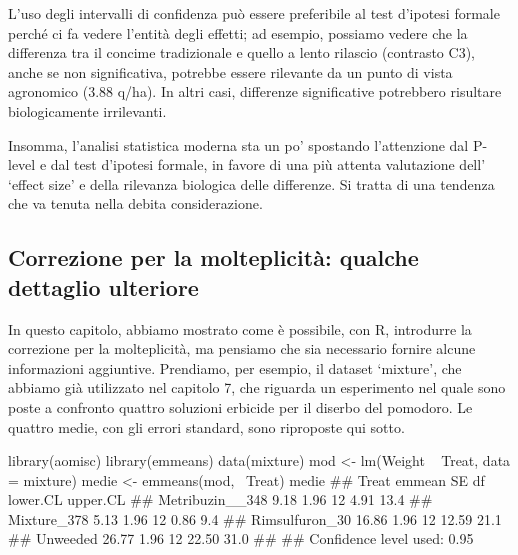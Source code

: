 \documentclass[a4paper,12pt,oneside]{book}
\newenvironment{Shaded}{}{}
\newcommand{\KeywordTok}[1]{#1}
\newcommand{\DataTypeTok}[1]{#1}
\newcommand{\StringTok}[1]{#1}
\newcommand{\CommentTok}[1]{#1}
\newcommand{\OperatorTok}[1]{#1}
\newcommand{\NormalTok}[1]{#1}
\begin{document}
L'uso degli intervalli di confidenza può essere preferibile al test d'ipotesi formale perché ci fa vedere l'entità degli effetti; ad esempio, possiamo vedere che la differenza tra il concime tradizionale e quello a lento rilascio (contrasto C3), anche se non significativa, potrebbe essere rilevante da un punto di vista agronomico (3.88 q/ha). In altri casi, differenze significative potrebbero risultare biologicamente irrilevanti.

Insomma, l'analisi statistica moderna sta un po' spostando l'attenzione dal P-level e dal test d'ipotesi formale, in favore di una più attenta valutazione dell' `effect size' e della rilevanza biologica delle differenze. Si tratta di una tendenza che va tenuta nella debita considerazione.

\hypertarget{correzione-per-la-molteplicita-qualche-dettaglio-ulteriore}{%
\subsection{Correzione per la molteplicità: qualche dettaglio ulteriore}\label{correzione-per-la-molteplicita-qualche-dettaglio-ulteriore}}

In questo capitolo, abbiamo mostrato come è possibile, con R, introdurre la correzione per la molteplicità, ma pensiamo che sia necessario fornire alcune informazioni aggiuntive. Prendiamo, per esempio, il dataset `mixture', che abbiamo già utilizzato nel capitolo 7, che riguarda un esperimento nel quale sono poste a confronto quattro soluzioni erbicide per il diserbo del pomodoro. Le quattro medie, con gli errori standard, sono riproposte qui sotto.

\begin{Shaded}
\begin{Highlighting}[]
\KeywordTok{library}\NormalTok{(aomisc)}
\KeywordTok{library}\NormalTok{(emmeans)}
\KeywordTok{data}\NormalTok{(mixture)}
\NormalTok{mod <-}\StringTok{ }\KeywordTok{lm}\NormalTok{(Weight }\OperatorTok{~}\StringTok{ }\NormalTok{Treat, }\DataTypeTok{data =}\NormalTok{ mixture)}
\NormalTok{medie <-}\StringTok{ }\KeywordTok{emmeans}\NormalTok{(mod, }\OperatorTok{~}\NormalTok{Treat)}
\NormalTok{medie}
\CommentTok{##  Treat           emmean   SE df lower.CL upper.CL}
\CommentTok{##  Metribuzin__348   9.18 1.96 12     4.91     13.4}
\CommentTok{##  Mixture_378       5.13 1.96 12     0.86      9.4}
\CommentTok{##  Rimsulfuron_30   16.86 1.96 12    12.59     21.1}
\CommentTok{##  Unweeded         26.77 1.96 12    22.50     31.0}
\CommentTok{## }
\CommentTok{## Confidence level used: 0.95}
\end{Highlighting}
\end{Shaded}
\end{document}
